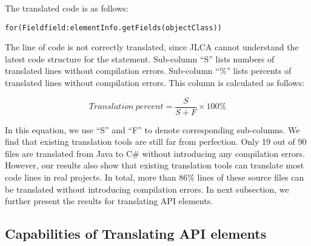 The translated code is as follows:

\begin{CodeOut}%
\begin{alltt}
for(Field field: elementInfo.getFields(objectClass))
\end{alltt}
\end{CodeOut}

The line of code is not correctly translated, since JLCA cannot understand the latest code structure for the  statement. Sub-column ``S'' lists numbers of translated lines without compilation errors. Sub-column ``\%'' lists percents of translated lines without compilation errors. This column is calculated as follows:

\begin{equation}\label{eq-correctpercent}
Translation\ percent=\frac{S}{S+F}\times 100\%
\end{equation}%

In this equation, we use ``S'' and ``F'' to denote corresponding sub-columns. We find that existing translation tools are still far from perfection. Only 19 out of 90 files are translated from Java to C\# without introducing any compilation errors. However, our results also show that existing translation tools can translate most code lines in real projects. In total, more than 86\% lines of these source files can be translated without introducing compilation errors. In next subsection, we further present the results for translating API elements.

\subsection{Capabilities of Translating API elements}
\label{sec:real:api}

